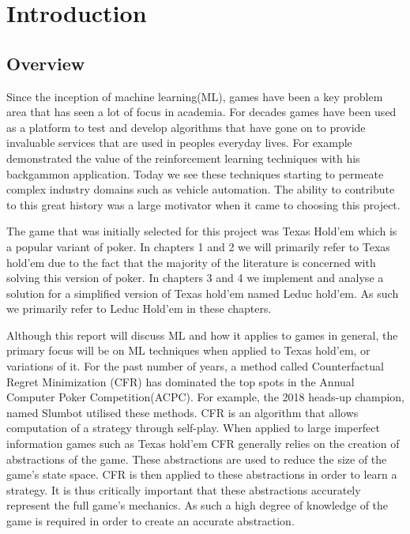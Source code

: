 \chapter{Introduction}
\label{ch:intro}

\section{Overview}\label{sec:overview}
Since the inception of machine learning(ML), games have been a key problem area that has seen a lot of focus
in academia.
For decades games have been used as a platform to test and develop algorithms that have gone on to provide invaluable
services that are used in peoples everyday lives.
For example\citep{tesauro1995td} demonstrated the value of the reinforcement learning techniques
with his backgammon application.
Today we see these techniques starting to permeate complex industry domains such as vehicle
automation\citep{desjardins2011cooperative}.
The ability to contribute to this great history was a large motivator when it came to choosing this project.

The game that was initially selected for this project was Texas Hold'em which is a popular
variant of poker.
In chapters 1 and 2 we will primarily refer to Texas hold'em due to the
fact that the majority of the literature is concerned with solving this version of poker.
In chapters 3 and 4 we implement and analyse a solution for a simplified version of Texas
hold'em named Leduc hold'em.
As such we primarily refer to Leduc Hold'em in these chapters.

Although this report will discuss ML and how it applies to games in general, the primary
focus will be on ML techniques when applied to Texas hold'em, or variations of it.
For the past number of years, a method called Counterfactual Regret Minimization (CFR) has dominated the
top spots in the Annual Computer Poker Competition(ACPC).
For example, the 2018 heads-up champion, named Slumbot utilised these methods\citep{jackson2013slumbot}.
CFR is an algorithm that allows computation of a strategy through self-play\citep{zinkevich2008regret}.
When applied to large imperfect information games such as Texas hold'em CFR generally relies on the
creation of abstractions of the game\citep{neller2013introduction}.
These abstractions are used to reduce the size of the game's state space.
CFR is then applied to these abstractions in order to learn a strategy.
It is thus critically important that these abstractions accurately represent the full game's mechanics.
As such a high degree of knowledge of the game is required in order to create an accurate abstraction.

